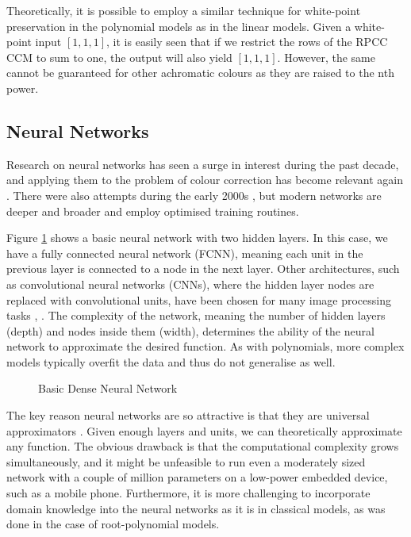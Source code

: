 Theoretically, it is possible to employ a similar technique for white-point preservation in the polynomial models as in the linear models. Given a white-point input $[1,1,1]$, it is easily seen that if we restrict the rows of the RPCC CCM to sum to one, the output will also yield $[1,1,1]$. However, the same cannot be guaranteed for other achromatic colours as they are raised to the nth power. 

\subsection{Neural Networks}

Research on neural networks has seen a surge in interest during the past decade, and applying them to the problem of colour correction has become relevant again \cite{macdonald2021camera, kucuk2022exposure, kucuk2022comparison}. There were also attempts during the early 2000s \cite{CCvsPol, nn2001}, but modern networks are deeper and broader and employ optimised training routines.

Figure \ref{fig:nn} shows a basic neural network with two hidden layers. In this case, we have a fully connected neural network (FCNN), meaning each unit in the previous layer is connected to a node in the next layer. Other architectures, such as convolutional neural networks (CNNs), where the hidden layer nodes are replaced with convolutional units, have been chosen for many image processing tasks \cite{CNN}, \cite{Backpropagation}. The complexity of the network, meaning the number of hidden layers (depth) and nodes inside them (width), determines the ability of the neural network to approximate the desired function. As with polynomials, more complex models typically overfit the data and thus do not generalise as well.

\begin{figure}
\centering

\caption{Basic Dense Neural Network}
\label{fig:nn}
\end{figure}

The key reason neural networks are so attractive is that they are universal approximators \cite{hornik1989multilayer}. Given enough layers and units, we can theoretically approximate any function. The obvious drawback is that the computational complexity grows simultaneously, and it might be unfeasible to run even a moderately sized network with a couple of million parameters on a low-power embedded device, such as a mobile phone. Furthermore, it is more challenging to incorporate domain knowledge into the neural networks as it is in classical models, as was done in the case of root-polynomial models.

